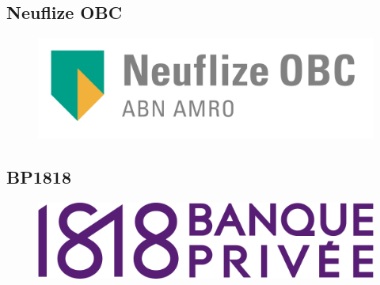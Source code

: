 \subsection{Neuflize OBC}

\begin{figure}[h]
	\includegraphics[scale=0.3]{images/neuflizeOBCLogo.png}
	\centering
	\label{neuflizeOBCLogo}
\end{figure}

\subsection{BP1818}

\begin{figure}[h]
	\includegraphics[scale=0.3]{images/bp1818Logo.png}
	\centering
	\label{bp1818Logo}
\end{figure}
		
		